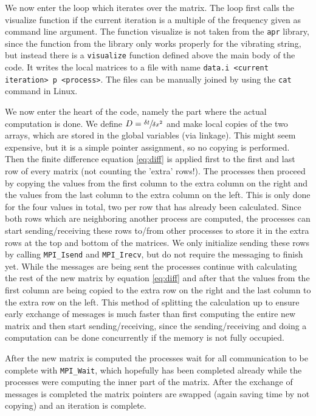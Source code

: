 \documentclass[11pt,a4paper,onecolumn]{article}
\begin{document}
We now enter the loop which iterates over the matrix. The loop first calls the visualize function if the current iteration is a multiple of the frequency given as command line argument. The function visualize is not taken from the \texttt{apr} library, since the function from the library only works properly for the vibrating string, but instead there is a \texttt{visualize} function defined above the main body of the code. It writes the local matrices to a file with name \texttt{data.i <current iteration> p <process>}. The files can be manually joined by using the \texttt{cat} command in Linux.

We now enter the heart of the code, namely the part where the actual computation is done. We define $D = \sfrac{\delta t}{\delta x^2}$ and make local copies of the two arrays, which are stored in the global variables (via linkage). This might seem expensive, but it is a simple pointer assignment, so no copying is performed. Then the finite difference equation \ref{eq:diff} is applied first to the first and last row of every matrix (not counting the 'extra' rows!). The processes then proceed by copying the values from the first column to the extra column on the right and the values from the last column to the extra column on the left. This is only done for the four values in total, two per row that has already been calculated. Since both rows which are neighboring another process are computed, the processes can start sending/receiving these rows to/from other processes to store it in the extra rows at the top and bottom of the matrices. We only initialize sending these rows by calling \texttt{MPI\_Isend} and \texttt{MPI\_Irecv}, but do not require the messaging to finish yet. While the messages are being sent the processes continue with calculating the rest of the new matrix by equation \ref{eq:diff} and after that the values from the first column are being copied to the extra row on the right and the last column to the extra row on the left. This method of splitting the calculation up to ensure early exchange of messages is much faster than first computing the entire new matrix and then start sending/receiving, since the sending/receiving and doing a computation can be done concurrently if the memory is not fully occupied.

After the new matrix is computed the processes wait for all communication to be complete with \texttt{MPI\_Wait}, which hopefully has been completed already while the processes were computing the inner part of the matrix. After the exchange of messages is completed the matrix pointers are swapped (again saving time by not copying) and an iteration is complete. 
\end{document}
